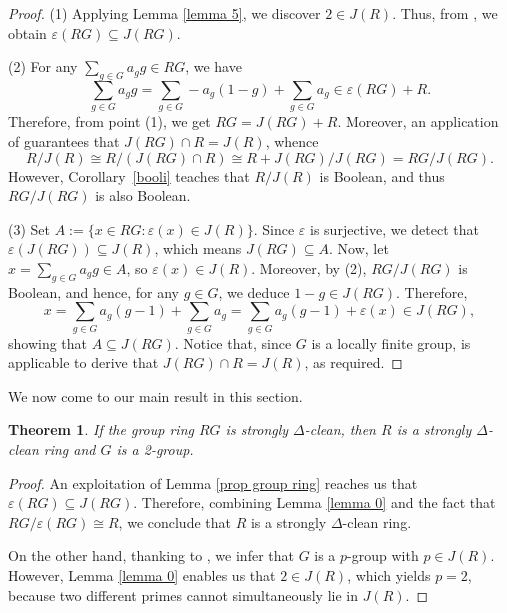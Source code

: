 \documentclass[12pt]{amsart}
\newtheorem{theorem}{Theorem}[section]
\theoremstyle{definition}
\begin{document}
\begin{proof}
(1) Applying Lemma \ref{lemma 5}, we discover $2 \in J(R)$. Thus, from \cite[Lemma 2]{zucc}, we obtain $\varepsilon(RG) \subseteq J(RG)$.

\medskip

(2) For any $\sum_{g \in G} a_gg \in RG$, we have
\[
\sum_{g \in G} a_gg = \sum_{g \in G} -a_g(1-g) + \sum_{g \in G} a_g \in \varepsilon(RG) + R.
\]
Therefore, from point (1), we get $RG = J(RG) + R$. Moreover, an application of \cite[Proposition 9]{conel} guarantees that $J(RG) \cap R = J(R)$, whence
\[
R/J(R) \cong R/(J(RG)\cap R) \cong R+J(RG)/J(RG) = RG/J(RG).
\]
However, Corollary~\ref{booli} teaches that $R/J(R)$ is Boolean, and thus $RG/J(RG)$ is also Boolean.

\medskip

(3) Set $A := \{x \in RG : \varepsilon(x) \in J(R)\}$. Since $\varepsilon$ is surjective, we detect that $\varepsilon(J(RG)) \subseteq J(R)$, which means $J(RG) \subseteq A$. Now, let $x = \sum_{g \in G} a_gg \in A$, so $\varepsilon(x) \in J(R)$. Moreover, by (2), $RG/J(RG)$ is Boolean, and hence, for any $g \in G$, we deduce $1-g \in J(RG)$. Therefore,
\[
x = \sum_{g \in G} a_g(g-1) + \sum_{g \in G} a_g = \sum_{g \in G} a_g(g-1) + \varepsilon(x) \in J(RG),
\]
showing that $A \subseteq J(RG)$. Notice that, since $G$ is a locally finite group, \cite[Proposition 9]{conel} is applicable to derive that $J(RG) \cap R = J(R)$, as required.
\end{proof}

We now come to our main result in this section.

\begin{theorem}\label{1.6}
If the group ring $RG$ is strongly $\Delta$-clean, then $R$ is a strongly $\Delta$-clean ring and $G$ is a 2-group.
\end{theorem}

\begin{proof}
An exploitation of Lemma \ref{prop group ring} reaches us that $\varepsilon(RG) \subseteq J(RG)$. Therefore, combining Lemma \ref{lemma 0} and the fact that $RG/\varepsilon(RG) \cong R$, we conclude that $R$ is a strongly $\Delta$-clean ring.

On the other hand, thanking to \cite[Proposition 15]{conel}, we infer that $G$ is a $p$-group with $p \in J(R)$. However, Lemma \ref{lemma 0} enables us that $2 \in J(R)$, which yields $p=2$, because two different primes cannot simultaneously lie in $J(R)$.
\end{proof}
\end{document}
